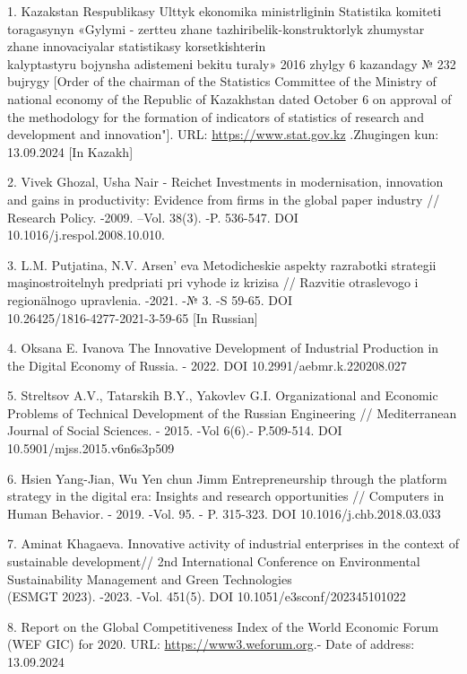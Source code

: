 \begin{references}
1. Kazakstan Respublikasy Ulttyk ekonomika ministrlіgіnіn Statistika
komitetі toragasynyn «Gylymi - zertteu zhane tazhіribelіk-konstruktorlyk
zhumystar zhane innovaciyalar statistikasy korsetkіshterіn \\kalyptastyru
bojynsha adіstemenі bekіtu turaly» 2016 zhylgy 6 kazandagy № 232 bujrygy
{[}Order of the chairman of the Statistics Committee of the Ministry of
national economy of the Republic of Kazakhstan dated October 6 on
approval of the methodology for the formation of indicators of
statistics of research and development and innovation"{]}. URL:
\href{https://www.stat.gov.kz}{https://www.stat.gov.kz} .Zhugingen kun: 13.09.2024 {[}In Kazakh{]}

2. Vivek Ghozal, Usha Nair - Reichet Investments in modernisation,
innovation and gains in productivity: Evidence from firms in the global
paper industry // Research Policy. -2009. --Vol. 38(3). -P. 536-547. DOI
10.1016/j.respol.2008.10.010.

3. L.M. Putjatina, N.V. Arsen' eva Metodicheskie aspekty
razrabotki strategii maşinostroitelnyh predpriati pri vyhode iz krizisa
// Razvitie otraslevogo i regionälnogo upravlenia. -2021. -№ 3. -S
59-65. DOI \\10.26425/1816-4277-2021-3-59-65 {[}In Russian{]}

4. Oksana E. Ivanova The Innovative Development of Industrial Production
in the Digital Economy of Russia. - 2022. DOI 10.2991/aebmr.k.220208.027

5. Streltsov A.V., Tatarskih B.Y., Yakovlev G.I. Organizational and
Economic Problems of Technical Development of the Russian Engineering //
Mediterranean Journal of Social Sciences. - 2015. -Vol 6(6).- P.509-514.
DOI 10.5901/mjss.2015.v6n6s3p509

6. Hsien Yang-Jian, Wu Yen chun Jimm Entrepreneurship through the
platform strategy in the digital era: Insights and research
opportunities // Computers in Human Behavior. - 2019. -Vol. 95. - P.
315-323. DOI 10.1016/j.chb.2018.03.033

7. Aminat Khagaeva. Innovative activity of industrial enterprises in the
context of sustainable development// 2nd International Conference on
Environmental Sustainability Management and Green Technologies \\(ESMGT
2023). -2023. -Vol. 451(5). DOI 10.1051/e3sconf/202345101022

8. Report on the Global Competitiveness Index of the World Economic
Forum (WEF GIC) for 2020. URL:
\href{https://www3.weforum.org/docs/WEF_TheGlobalCompetitivenessReport2020.pdf}{https://www3.weforum.org}.-
Date of address: 13.09.2024


\end{references}
